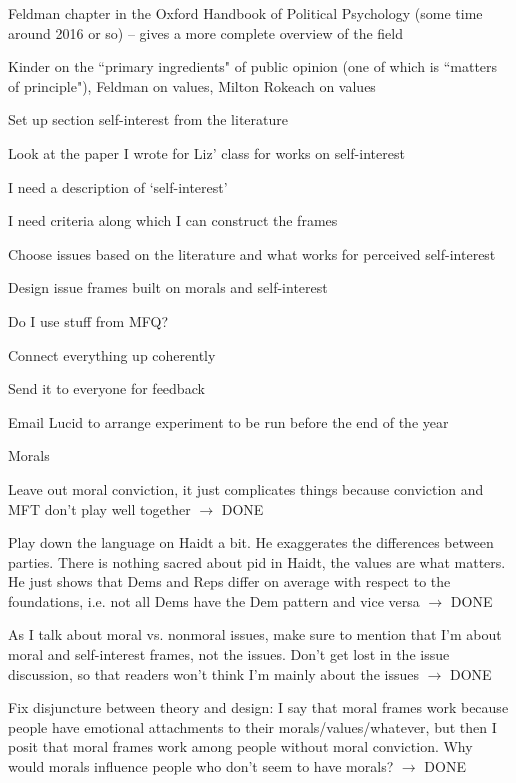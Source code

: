 \documentclass[12pt]{article}
\begin{document}
\begin{coi}
\begin{coi}
				\item Feldman chapter in the Oxford Handbook of Political Psychology (some time around 2016 or so) -- gives a more complete overview of the field
				\item Kinder on the ``primary ingredients" of public opinion (one of which is ``matters of principle"), Feldman on values, Milton Rokeach on values
			\end{coi}
		\item Set up section self-interest from the literature
			\begin{coi}
				\item Look at the paper I wrote for Liz' class for works on self-interest
				\item I need a description of `self-interest'
				\item I need criteria along which I can construct the frames
			\end{coi}
		\item Choose issues based on the literature and what works for perceived self-interest
		\item Design issue frames built on morals and self-interest
			\begin{coi}
				\item Do I use stuff from MFQ?
			\end{coi}
		\item Connect everything up coherently
		\item Send it to everyone for feedback
		\item Email Lucid to arrange experiment to be run before the end of the year
		\item Morals
			\begin{coi}
				\item Leave out moral conviction, it just complicates things because conviction and MFT don't play well together $\rightarrow$ DONE
				\item Play down the language on Haidt a bit. He exaggerates the differences between parties. There is nothing sacred about pid in Haidt, the values are what matters. He just shows that Dems and Reps differ on average with respect to the foundations, i.e. not all Dems have the Dem pattern and vice versa $\rightarrow$ DONE
				\item As I talk about moral vs. nonmoral issues, make sure to mention that I'm about moral and self-interest frames, not the issues. Don't get lost in the issue discussion, so that readers won't think I'm mainly about the issues $\rightarrow$ DONE
				\item Fix disjuncture between theory and design: I say that moral frames work because people have emotional attachments to their morals/values/whatever, but then I posit that moral frames work among people without moral conviction. Why would morals influence people who don't seem to have morals? $\rightarrow$ DONE

\end{coi}
\end{coi}
\end{document}
